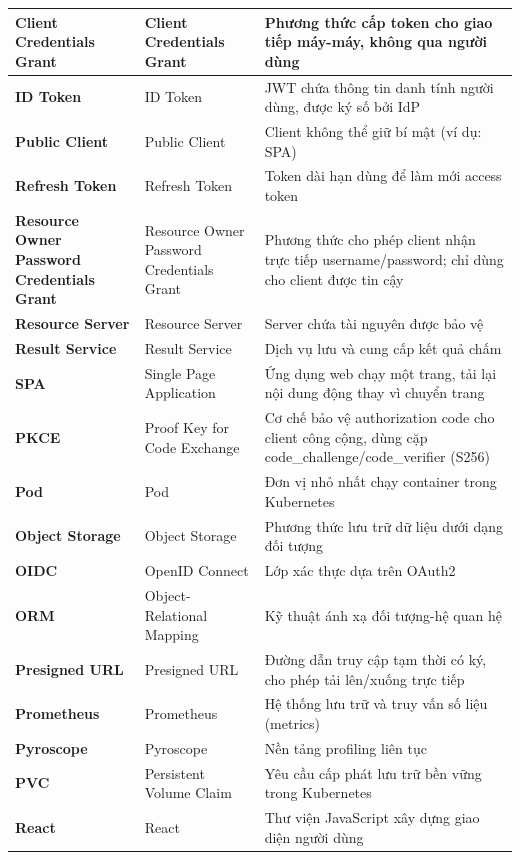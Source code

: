 \documentclass[../BTL.tex]{subfiles}
\begin{document}
\begin{longtable}{|p{3.2cm}|p{3.5cm}|p{7.1cm}|}
  \textbf{Client Credentials Grant} & Client Credentials Grant & Phương thức cấp token cho giao tiếp máy-máy, không qua người dùng\\ \hline
  \textbf{ID Token} & ID Token & JWT chứa thông tin danh tính người dùng, được ký số bởi IdP\\ \hline
  \textbf{Public Client} & Public Client & Client không thể giữ bí mật (ví dụ: SPA)\\ \hline
  \textbf{Refresh Token} & Refresh Token & Token dài hạn dùng để làm mới access token\\ \hline
  \textbf{Resource Owner Password Credentials Grant} & Resource Owner Password Credentials Grant & Phương thức cho phép client nhận trực tiếp username/password; chỉ dùng cho client được tin cậy\\ \hline
  \textbf{Resource Server} & Resource Server & Server chứa tài nguyên được bảo vệ\\ \hline
  \textbf{Result Service} & Result Service & Dịch vụ lưu và cung cấp kết quả chấm\\ \hline
  \textbf{SPA} & Single Page Application & Ứng dụng web chạy một trang, tải lại nội dung động thay vì chuyển trang\\ \hline
  \textbf{PKCE} & Proof Key for Code Exchange & Cơ chế bảo vệ authorization code cho client công cộng, dùng cặp code\_challenge/code\_verifier (S256)\\ \hline
  \textbf{Pod} & Pod & Đơn vị nhỏ nhất chạy container trong Kubernetes\\ \hline
  \textbf{Object Storage} & Object Storage & Phương thức lưu trữ dữ liệu dưới dạng đối tượng\\ \hline
	\textbf{OIDC} & OpenID Connect & Lớp xác thực dựa trên OAuth2\\ \hline
	\textbf{ORM} & Object-Relational Mapping & Kỹ thuật ánh xạ đối tượng-hệ quan hệ\\ \hline
	\textbf{Presigned URL} & Presigned URL & Đường dẫn truy cập tạm thời có ký, cho phép tải lên/xuống trực tiếp\\ \hline
	\textbf{Prometheus} & Prometheus & Hệ thống lưu trữ và truy vấn số liệu (metrics)\\ \hline
	\textbf{Pyroscope} & Pyroscope & Nền tảng profiling liên tục\\ \hline
	\textbf{PVC} & Persistent Volume Claim & Yêu cầu cấp phát lưu trữ bền vững trong Kubernetes\\ \hline
	\textbf{React} & React & Thư viện JavaScript xây dựng giao diện người dùng\\ \hline

\end{longtable}
\end{document}
